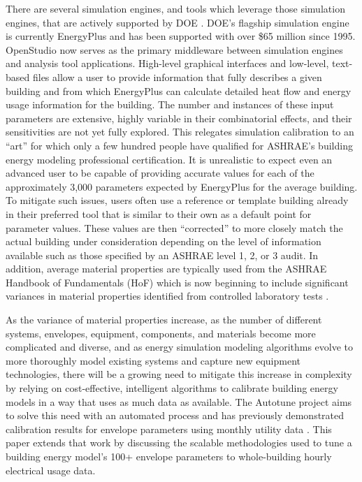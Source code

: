 \documentclass[preprint, review, 12pt]{elsarticle}
\begin{document}
There are several simulation engines, and tools which leverage those simulation engines, that are actively supported by DOE \cite{cit:doetools2012}. DOE’s flagship simulation engine is currently EnergyPlus \cite{cit:energyplus} and has been supported with over \$65 million since 1995. OpenStudio \cite{cit:nrel2012} now serves as the primary middleware between simulation engines and analysis tool applications. High-level graphical interfaces and low-level, text-based files allow a user to provide information that fully describes a given building and from which EnergyPlus can calculate detailed heat flow and energy usage information for the building. The number and instances of these input parameters are extensive, highly variable in their combinatorial effects, and their sensitivities are not yet fully explored. This relegates simulation calibration to an ``art'' for which only a few hundred people have qualified for ASHRAE's building energy modeling professional certification. It is unrealistic to expect even an advanced user to be capable of providing accurate values for each of the approximately 3,000 parameters expected by EnergyPlus for the average building. To mitigate such issues, users often use a reference or template building already in their preferred tool that is similar to their own as a default point for parameter values. These values are then ``corrected'' to more closely match the actual building under consideration depending on the level of information available such as those specified by an ASHRAE level 1, 2, or 3 audit. In addition, average material properties are typically used from the ASHRAE Handbook of Fundamentals (HoF) which is now beginning to include significant variances in material properties identified from controlled laboratory tests \cite{cit:ashrae2013}.

As the variance of material properties increase, as the number of different systems, envelopes, equipment, components, and materials become more complicated and diverse, and as energy simulation modeling algorithms evolve to more thoroughly model existing systems and capture new equipment technologies, there will be a growing need to mitigate this increase in complexity by relying on cost-effective, intelligent algorithms to calibrate building energy models in a way that uses as much data as available. The Autotune project \cite{cit:new2012} aims to solve this need with an automated process and has previously demonstrated calibration results for envelope parameters using monthly utility data \cite{cit:garrett2013}. This paper extends that work by discussing the scalable methodologies used to tune a building energy model's 100+ envelope parameters to whole-building hourly electrical usage data.
\end{document}
